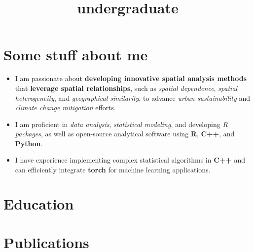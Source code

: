 \documentclass[11pt,a4paper,]{moderncv}
\title{undergraduate}
\providecommand{\tightlist}{%
	\setlength{\itemsep}{0pt}\setlength{\parskip}{0pt}}
\begin{document}
\makecvtitle



\section{Some stuff about me}\label{some-stuff-about-me}

\begin{itemize}
\tightlist
\item
  I am passionate about \textbf{developing innovative spatial analysis
  methods} that \textbf{leverage spatial relationships}, such as
  \emph{spatial dependence}, \emph{spatial heterogeneity}, and
  \emph{geographical similarity}, to advance \emph{urban sustainability}
  and \emph{climate change mitigation} efforts.
\item
  I am proficient in \emph{data analysis}, \emph{statistical modeling},
  and developing \emph{R packages}, as well as open-source analytical
  software using \textbf{R}, \textbf{C++}, and \textbf{Python}.
\item
  I have experience implementing complex statistical algorithms in
  \textbf{C++} and can efficiently integrate \textbf{torch} for machine
  learning applications.
\end{itemize}

\section{Education}\label{education}

\nopagebreak

\section{Publications}\label{publications}
\end{document}
